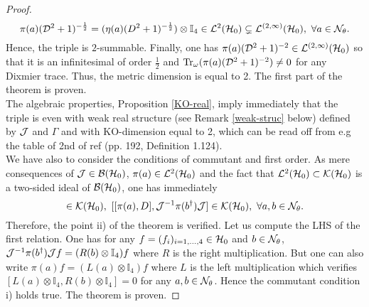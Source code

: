 \documentclass[a4paper,11pt,twoside]{article}
\numberwithin{equation}{section}
\newcommand\bbone{{ \mathbb{I}}}
\DeclareMathOperator{\tr}{Tr}
\theoremstyle{nonumberplain}
\newtheorem{proof}{Proof}
\newcounter{and}
\begin{document}
\begin{proof}
\begin{equation}
\pi(a)({\cal{D}}^2+1)^{-\frac{1}{2}}=(\eta(a)(D^2+1)^{-\frac{1}{2}})\otimes\bbone_4\in{\cal{L}}^2({\cal{H}}_0)\subsetneq{\cal{L}}^{(2,\infty)}({\cal{H}}_0),\ \forall a\in{\cal{N}}_\theta.
\end{equation}
Hence, the triple is $2$-summable. Finally, one has $\pi(a)({\cal{D}}^2+1)^{-2}\in{\cal{L}}^{(2,\infty)}({\cal{H}}_0)$ so that it is an infinitesimal of order $\frac{1}{2}$ and $\tr_\omega(\pi(a)({\cal{D}}^2+1)^{-2})\ne0$ for any Dixmier trace. Thus, the metric dimension is equal to 2. The first part of the theorem is proven.\\
The algebraic properties, Proposition \ref{KO-real}, imply immediately that the triple is even with weak real structure (see Remark \ref{weak-struc} below) defined by ${\cal{J}}$ and $\Gamma$ and with KO-dimension equal to 2, which can be read off from e.g the table of 2nd of ref \cite{Connes1} (pp. 192, Definition 1.124).\\
We have also to consider the conditions of commutant and first order. As mere consequences of ${\cal{J}}\in{\cal{B}}({\cal{H}}_0)$, $\pi(a)\in{\cal{L}}^2({\cal{H}}_0)$ and the fact that ${\cal{L}}^2({\cal{H}}_0)\subset{\cal{K}}({\cal{H}}_0)$ is a two-sided ideal of ${\cal{B}}({\cal{H}}_0)$, one has immediately
\begin{equation}
[\pi(a),{\cal{J}}^{-1}\pi(b^\dag){\cal{J}}]\in{\cal{K}}({\cal{H}}_0),\ [[\pi(a),D],{\cal{J}}^{-1}\pi(b^\dag){\cal{J}}]\in{\cal{K}}({\cal{H}}_0),\ \forall 
a,b\in{\cal{N}}_\theta.
\end{equation}
Therefore, the point ii) of the theorem is verified. Let us compute the LHS of the first relation. One has for any $f=(f_i)_{i=1,...,4}\in{\cal{H}}_0$ and $b\in{\cal{N}}_\theta$,  ${\cal{J}}^{-1}\pi(b^\dag){\cal{J}}f=(R(b)\otimes\bbone_4)f$ where $R$ is the right multiplication. But one can also write $\pi(a) f=(L(a)\otimes\bbone_4)f$ where $L$ is the left multiplication which verifies $[L(a)\otimes\bbone_4,R(b)\otimes\bbone_4]=0$ for any $a,b\in{\cal{N}}_\theta$. Hence the commutant condition i) holds true. The theorem is proven.
\end{proof}
\end{document}

